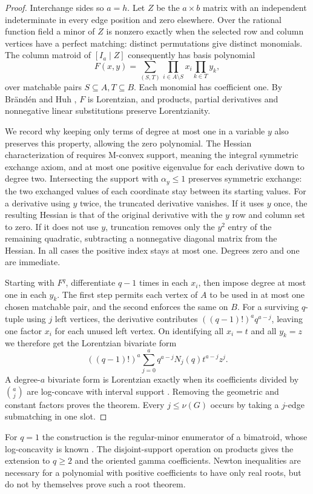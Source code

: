 \documentclass[11pt]{article}
\begin{document}
\begin{proof}
Interchange sides so $a=h$. Let $Z$ be the $a\times b$ matrix with an independent indeterminate in every edge position and zero elsewhere. Over the rational function field a minor of $Z$ is nonzero exactly when the selected row and column vertices have a perfect matching: distinct permutations give distinct monomials. The column matroid of $[I_a\mid Z]$ consequently has basis polynomial
\[
 F(x,y)=\sum_{(S,T)} \prod_{i\in A\setminus S}x_i\prod_{k\in T}y_k ,
\]
over matchable pairs $S\subseteq A,T\subseteq B$. Each monomial has coefficient one. By Br\"and\'en and Huh \cite{BH}, $F$ is Lorentzian, and products, partial derivatives and nonnegative linear substitutions preserve Lorentzianity.

We record why keeping only terms of degree at most one in a variable $y$ also preserves this property, allowing the zero polynomial. The Hessian characterization of \cite[Thm.~2.25]{BH} requires M-convex support, meaning the integral symmetric exchange axiom, and at most one positive eigenvalue for each derivative down to degree two. Intersecting the support with $\alpha_y\le1$ preserves symmetric exchange: the two exchanged values of each coordinate stay between its starting values. For a derivative using $y$ twice, the truncated derivative vanishes. If it uses $y$ once, the resulting Hessian is that of the original derivative with the $y$ row and column set to zero. If it does not use $y$, truncation removes only the $y^2$ entry of the remaining quadratic, subtracting a nonnegative diagonal matrix from the Hessian. In all cases the positive index stays at most one. Degrees zero and one are immediate.

Starting with $F^q$, differentiate $q-1$ times in each $x_i$, then impose degree at most one in each $y_k$. The first step permits each vertex of $A$ to be used in at most one chosen matchable pair, and the second enforces the same on $B$. For a surviving $q$-tuple using $j$ left vertices, the derivative contributes $((q-1)!)^a q^{a-j}$, leaving one factor $x_i$ for each unused left vertex. On identifying all $x_i=t$ and all $y_k=z$ we therefore get the Lorentzian bivariate form
\[
 ((q-1)!)^a\sum_{j=0}^{a}q^{a-j}N_j(q)t^{a-j}z^j.
\]
A degree-$a$ bivariate form is Lorentzian exactly when its coefficients divided by $\binom aj$ are log-concave with interval support \cite[Ex.~2.26]{BH}. Removing the geometric and constant factors proves the theorem. Every $j\le\nu(G)$ occurs by taking a $j$-edge submatching in one slot.
\end{proof}
For $q=1$ the construction is the regular-minor enumerator of a bimatroid, whose log-concavity is known \cite{RU}. The disjoint-support operation on products gives the extension to $q\ge2$ and the oriented gamma coefficients. Newton inequalities are necessary for a polynomial with positive coefficients to have only real roots, but do not by themselves prove such a root theorem.
\end{document}

